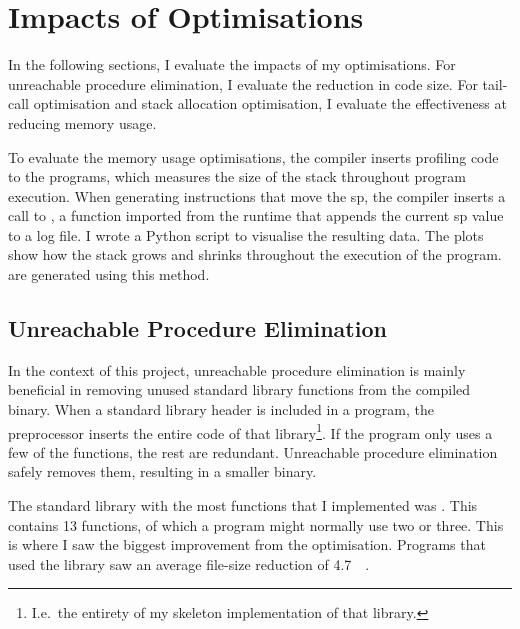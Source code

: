 \documentclass[00-main.tex]{subfiles}
\begin{document}
\section{Impacts of Optimisations}\label{sec:eval:optimisations}

In the following sections, I evaluate the impacts of my optimisations.
For unreachable procedure elimination, I evaluate the reduction in code size.
For tail-call optimisation and stack allocation optimisation, I evaluate the effectiveness at reducing memory usage.

To evaluate the memory usage optimisations, the compiler inserts profiling code to the programs, which measures the size of the stack throughout program execution.
When generating instructions that move the \acrlong{sp}, the compiler inserts a call to , a function imported from the runtime that appends the current \acrlong{sp} value to a log file.
I wrote a Python script to visualise the resulting data.
The plots show how the stack grows and shrinks throughout the execution of the program.
 are generated using this method.

\subsection{Unreachable Procedure Elimination}\label{sec:eval:unreachable procedure elimination}

In the context of this project, unreachable procedure elimination is mainly beneficial in removing unused standard library functions from the compiled binary.
When a standard library header is included in a program, the preprocessor inserts the entire code of that library\footnote{I.e.~the entirety of my skeleton implementation of that library.}.
If the program only uses a few of the functions, the rest are redundant.
Unreachable procedure elimination safely removes them, resulting in a smaller binary.


The standard library with the most functions that I implemented was .
This contains 13 functions, of which a program might normally use two or three.
This is where I saw the biggest improvement from the optimisation.
Programs that used the  library saw an average file-size reduction of \SI{4.7}{\kilo\byte}.
\end{document}
